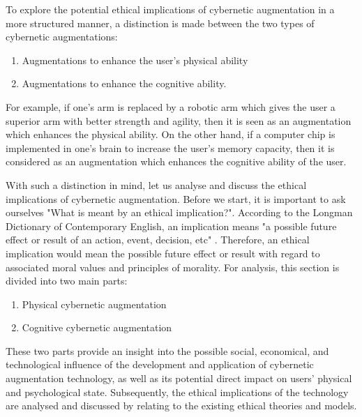 To explore the potential ethical implications of cybernetic augmentation in a more structured manner, a distinction is made between the two types of cybernetic augmentations: 
\begin{enumerate}
	\item Augmentations to enhance the user's physical ability
	\item Augmentations to enhance the cognitive ability.
\end{enumerate}
For example, if one's arm is replaced by a robotic arm which gives the user a superior arm with better strength and agility, then it is seen as an augmentation which enhances the physical ability. On the other hand, if a computer chip is implemented in one's brain to increase the user's memory capacity, then it is considered as an augmentation which enhances the cognitive ability of the user. 

With such a distinction in mind, let us analyse and discuss the ethical implications of cybernetic augmentation. Before we start, it is important to ask ourselves "What is meant by an ethical implication?". According to the Longman Dictionary of Contemporary English, an implication means "a possible future effect or result of an action, event, decision, etc" \cite{Longman_dic}. Therefore, an ethical implication would mean the possible future effect or result with regard to associated moral values and principles of morality. For analysis, this section is divided into two main parts: 

\begin{enumerate}
	\item Physical cybernetic augmentation
	\item Cognitive cybernetic augmentation
\end{enumerate}

These two parts provide an insight into the possible social, economical, and technological influence of the development and application of cybernetic augmentation technology, as well as its potential direct impact on users' physical and psychological state. Subsequently, the ethical implications of the technology are analysed and discussed by relating to the existing ethical theories and models.



